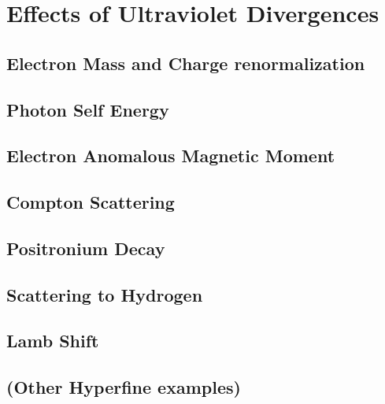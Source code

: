 \chapter{Effects of Ultraviolet Divergences}

\section{Electron Mass and Charge renormalization}
\section{Photon Self Energy}
\section{Electron Anomalous Magnetic Moment}
\section{Compton Scattering}
\section{Positronium Decay}
\section{Scattering to Hydrogen}
\section{Lamb Shift}
\section{(Other Hyperfine examples)}
